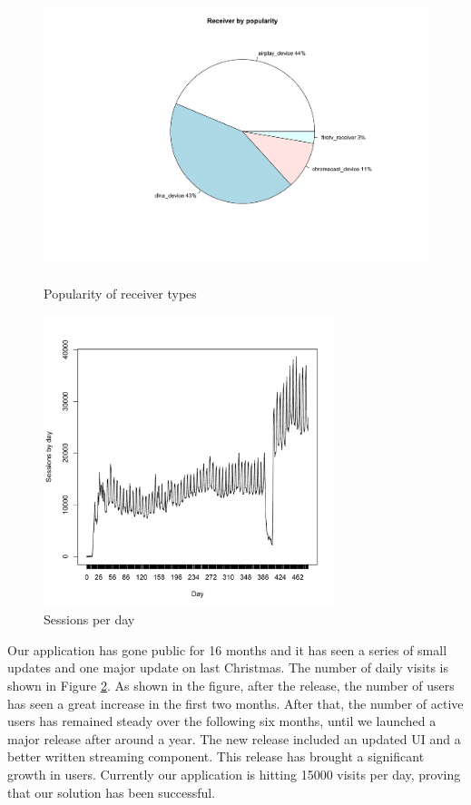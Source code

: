 \begin{figure}[htb]
\centering \includegraphics[height=8.5cm]{charts/receiver_popularity}
\caption{Popularity of receiver types \label{receiver_types}}
\end{figure}
\begin{figure}[hb]
\centering \includegraphics[height=8.5cm]{charts/sessions_per_day}
\caption{Sessions per day \label{sessions_perday}}
\end{figure}
Our application has gone public for 16 months and it has seen a series of small updates and one major update on last Christmas. The number of daily visits is shown in Figure \ref{sessions_perday}. As shown in the figure, after the release, the number of users has seen a great increase in the first two months. After that, the number of active users has remained steady over the following six months, until we launched a major release after around a year. The new release included an updated UI and a better written streaming component. This release has brought a significant growth in users. Currently our application is hitting 15000 visits per day,  proving that our solution has been successful.


